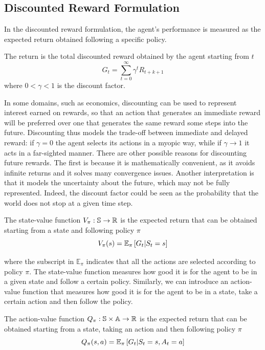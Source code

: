\subsection{Discounted Reward Formulation}
In the discounted reward formulation, the agent's performance is measured as
the expected return obtained following a specific policy.
\begin{definition}[Return]
	The return is the total discounted reward obtained by the agent starting 
	from $t$  
	\begin{equation*}
		G_t = \sum^{\infty}_{t=0} \gamma^t R_{t+k+1} 
	\end{equation*}
	where $0 < \gamma < 1$ is the discount factor.
\end{definition}
In some domains, such as economics, discounting can be used to represent
interest earned on rewards, so that an action that generates an immediate
reward will be preferred over one that generates the same reward some steps
into the future. Discounting thus models the trade-off between immediate and
delayed reward: if $\gamma = 0$ the agent selects its actions in a myopic way,
while if $\gamma \to 1$ it acts in a far-sighted manner. There are other
possible reasons for discounting future rewards. The first is because it is
mathematically convenient, as it avoids infinite returns and it solves many
convergence issues. Another interpretation is that it models the uncertainty
about the future, which may not be fully represented. Indeed, the discount
factor could be seen as the probability that the world does not stop at a given 
time step. 
\begin{definition}
	The state-value function $V_\pi: \S \to \R$ is the expected return that can
	be obtained starting from a state and following policy $\pi$
	\begin{equation}
		V_\pi(s) = \E[\pi]{G_t|S_t = s}
	\end{equation}
\end{definition}
where the subscript in $\mathbb{E}_{\pi}$ indicates that all the actions are selected according to policy $\pi$. The state-value function measures how good it is for the agent to be in a given state and follow a certain policy. Similarly, we can introduce an action-value function that measures how good it is for the agent to be in a state, take a certain action and then follow the policy. 
\begin{definition}
	The action-value function $Q_\pi: \S \times \A \to \R$ is the expected 
	return that can be obtained starting from a state, taking an action and
	then following policy $\pi$
	\begin{equation}
		Q_\pi(s,a) = \E[\pi]{G_t|S_t = s, A_t = a}
	\end{equation}
\end{definition}
